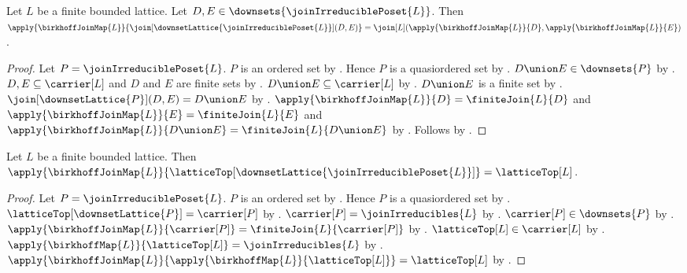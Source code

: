 \begin{theorem}\label{birkhoff_join_map_join}
    Let $L$ be a finite bounded lattice.
    Let $D,E\in\downsets{\joinIrreduciblePoset{L}}$.
    Then $\apply{\birkhoffJoinMap{L}}
        {\join[\downsetLattice{\joinIrreduciblePoset{L}}](D,E)}
        =\join[L]
            (\apply{\birkhoffJoinMap{L}}{D},
             \apply{\birkhoffJoinMap{L}}{E})$.
\end{theorem}
\begin{proof}
    Let $P=\joinIrreduciblePoset{L}$.
    $P$ is an ordered set by
        .
    Hence $P$ is a quasiordered set by .
    $D\union E\in\downsets{P}$ by
        .
    $D,E\subseteq\carrier[L]$ and $D$ and $E$ are finite sets by
        .
    $D\union E\subseteq\carrier[L]$ by
        .
    $D\union E$ is a finite set by
        .
    $\join[\downsetLattice{P}](D,E)=D\union E$ by
        .
    $\apply{\birkhoffJoinMap{L}}{D}=\finiteJoin{L}{D}$ and
        $\apply{\birkhoffJoinMap{L}}{E}=\finiteJoin{L}{E}$ and
        $\apply{\birkhoffJoinMap{L}}{D\union E}
            =\finiteJoin{L}{D\union E}$ by
        .
    Follows by .
\end{proof}

\begin{proposition}\label{birkhoff_join_map_lattice_top}
    Let $L$ be a finite bounded lattice.
    Then $\apply{\birkhoffJoinMap{L}}
        {\latticeTop[\downsetLattice{\joinIrreduciblePoset{L}}]}
        =\latticeTop[L]$.
\end{proposition}
\begin{proof}
    Let $P=\joinIrreduciblePoset{L}$.
    $P$ is an ordered set by
        .
    Hence $P$ is a quasiordered set by .
    $\latticeTop[\downsetLattice{P}]=\carrier[P]$ by
        .
    $\carrier[P]=\joinIrreducibles{L}$ by
        .
    $\carrier[P]\in\downsets{P}$ by
        .
    $\apply{\birkhoffJoinMap{L}}{\carrier[P]}
        =\finiteJoin{L}{\carrier[P]}$ by
        .
    $\latticeTop[L]\in\carrier[L]$ by .
    $\apply{\birkhoffMap{L}}{\latticeTop[L]}
        =\joinIrreducibles{L}$ by .
    $\apply{\birkhoffJoinMap{L}}
        {\apply{\birkhoffMap{L}}{\latticeTop[L]}}
        =\latticeTop[L]$ by .
\end{proof}


